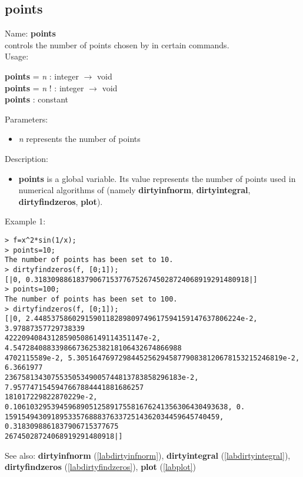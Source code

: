 \subsection{points}
\label{labpoints}
\noindent Name: \textbf{points}\\
controls the number of points chosen by \sollya in certain commands.\\
\noindent Usage: 
\begin{center}
\textbf{points} = \emph{n} : \textsf{integer} $\rightarrow$ \textsf{void}\\
\textbf{points} = \emph{n} ! : \textsf{integer} $\rightarrow$ \textsf{void}\\
\textbf{points} : \textsf{constant}\\
\end{center}
Parameters: 
\begin{itemize}
\item \emph{n} represents the number of points
\end{itemize}
\noindent Description: \begin{itemize}

\item \textbf{points} is a global variable. Its value represents the number of points
   used in numerical algorithms of \sollya (namely \textbf{dirtyinfnorm},
   \textbf{dirtyintegral}, \textbf{dirtyfindzeros}, \textbf{plot}).
\end{itemize}
\noindent Example 1: 
\begin{center}\begin{minipage}{15cm}\begin{Verbatim}[frame=single]
> f=x^2*sin(1/x);
> points=10;
The number of points has been set to 10.
> dirtyfindzeros(f, [0;1]);
[|0, 0.318309886183790671537767526745028724068919291480918|]
> points=100;
The number of points has been set to 100.
> dirtyfindzeros(f, [0;1]);
[|0, 2.4485375860291590118289809749617594159147637806224e-2, 3.97887357729738339
422209408431285905086149114351147e-2, 4.5472840883398667362538218106432674866988
4702115589e-2, 5.3051647697298445256294587790838120678153215246819e-2, 6.3661977
236758134307553505349005744813783858296183e-2, 7.9577471545947667884441881686257
181017229822870229e-2, 0.106103295394596890512589175581676241356306430493638, 0.
159154943091895335768883763372514362034459645740459, 0.3183098861837906715377675
26745028724068919291480918|]
\end{Verbatim}
\end{minipage}\end{center}
See also: \textbf{dirtyinfnorm} (\ref{labdirtyinfnorm}), \textbf{dirtyintegral} (\ref{labdirtyintegral}), \textbf{dirtyfindzeros} (\ref{labdirtyfindzeros}), \textbf{plot} (\ref{labplot})

